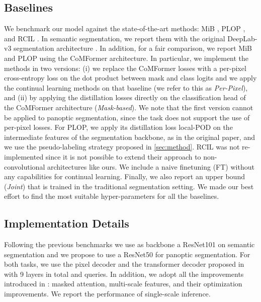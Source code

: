 \documentclass[10pt,twocolumn,letterpaper]{article}
\begin{document}
\subsection{Baselines} \label{sec:baselines}
We benchmark our model against the state-of-the-art methods: MiB \cite{cermelli2020modelingthebackground}, PLOP \cite{douillard2020plop}, and RCIL \cite{zhang2022rcil}. In semantic segmentation, we report them with the original DeepLab-v3 segmentation architecture \cite{chen2017deeplabv3}. In addition, for a fair comparison, we report MiB and PLOP using the CoMFormer architecture. In particular, we implement the methods in two versions: (i) we replace the CoMFormer losses with a per-pixel cross-entropy loss on the dot product between mask and class logits and we apply the continual learning methods on that baseline (we refer to this as \textit{Per-Pixel}), and (ii) by applying the distillation losses directly on the classification head of the CoMFormer architecture (\textit{Mask-based}). We note that the first version cannot be applied to panoptic segmentation, since the task does not support the use of per-pixel losses. For PLOP, we apply its distillation loss local-POD on the intermediate features of the segmentation backbone, as in the original paper, and we use the pseudo-labeling strategy proposed in \cref{sec:method}. RCIL was not re-implemented since it is not possible to extend their approach to non-convolutional architectures like ours. We include a naive finetuning (FT) without any capabilities for continual learning. 
Finally, we also report an upper bound (\textit{Joint}) that is trained in the traditional segmentation setting. We made our best effort to find the most suitable hyper-parameters for all the baselines. 

\subsection{Implementation Details}
\vspace{-1em} Following the previous benchmarks \cite{cermelli2020modelingthebackground, douillard2020plop} we use as backbone a ResNet101 \cite{he2016resnet} on semantic segmentation and we propose to use a ResNet50 \cite{he2016resnet} for panoptic segmentation. For both tasks, we use the pixel decoder and the transformer decoder proposed in \cite{cheng2021masked} with 9 layers in total and  queries. In addition, we adopt all the improvements introduced in \cite{cheng2021masked}: masked attention, multi-scale features, and their optimization improvements. 
We report the performance of single-scale inference.
\end{document}
